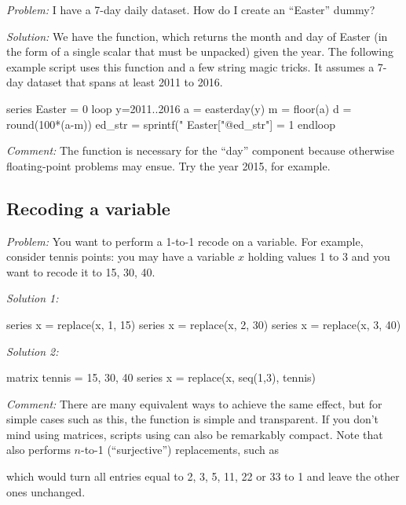\emph{Problem:} I have a 7-day daily dataset. How do I create an
``Easter'' dummy?

\emph{Solution:} We have the  function, which returns
the month and day of Easter (in the form of a single scalar that must
be unpacked) given the year. The following example script uses this
function and a few string magic tricks. It assumes a 7-day dataset
that spans at least 2011 to 2016.

\begin{code}
series Easter = 0
loop y=2011..2016
    a = easterday(y)
    m = floor(a)
    d = round(100*(a-m))
    ed_str = sprintf("%
    Easter["@ed_str"] = 1
endloop
\end{code}

\emph{Comment:} The  function is necessary for the
``day'' component because otherwise floating-point problems may
ensue. Try the year 2015, for example.

\subsection{Recoding a variable}

\emph{Problem:} You want to perform a 1-to-1 recode on a variable. For
example, consider tennis points: you may have a variable $x$ holding
values 1 to 3 and you want to recode it to 15, 30, 40.

\emph{Solution 1:}
\begin{code}
series x = replace(x, 1, 15)
series x = replace(x, 2, 30)
series x = replace(x, 3, 40)
\end{code}

\emph{Solution 2:}
\begin{code}
matrix tennis = {15, 30, 40}
series x = replace(x, seq(1,3), tennis)
\end{code}

\emph{Comment:} There are many equivalent ways to achieve the same
effect, but for simple cases such as this, the  function
is simple and transparent. If you don't mind using matrices, scripts
using  can also be remarkably compact. Note that
 also performs $n$-to-1 (``surjective'') replacements,
such as
\begin{code}
series x = replace{z, {2, 3, 5, 11, 22, 33}, 1)
\end{code}
which would turn all entries equal to 2, 3, 5, 11, 22 or 33 to 1 and
leave the other ones unchanged.

